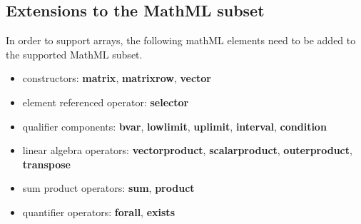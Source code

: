 \subsection{Extensions to the MathML subset}

In order to support arrays, the following mathML elements need to be added to the supported MathML subset. 
\begin{itemize}
\item constructors: {\bf matrix}, {\bf matrixrow}, {\bf vector}
\item element referenced operator: {\bf selector}
\item qualifier components: {\bf bvar}, {\bf lowlimit}, {\bf uplimit},  {\bf interval}, {\bf condition}
\item linear algebra operators: {\bf vectorproduct}, {\bf scalarproduct}, {\bf outerproduct}, {\bf transpose}
\item sum product operators: {\bf sum}, {\bf product}
\item quantifier operators: {\bf forall}, {\bf exists}
\end{itemize}

